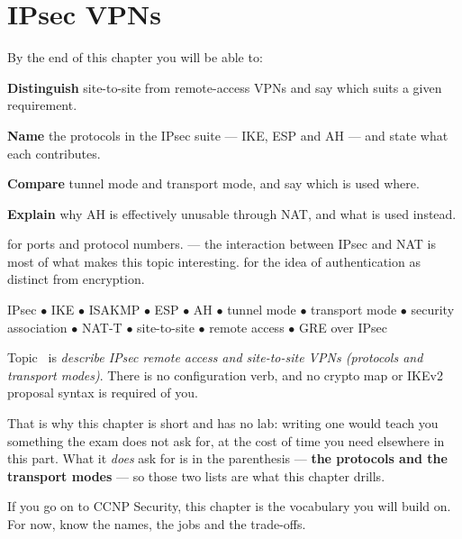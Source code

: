 \chapter{IPsec VPNs}\label{ch:vpn}

\begin{outcomes}
By the end of this chapter you will be able to:
\begin{tight}
  \item \textbf{Distinguish} site-to-site from remote-access VPNs and say which
        suits a given requirement.
  \item \textbf{Name} the protocols in the IPsec suite --- IKE, ESP and AH ---
        and state what each contributes.
  \item \textbf{Compare} tunnel mode and transport mode, and say which is used
        where.
  \item \textbf{Explain} why AH is effectively unusable through NAT, and what is
        used instead.
\end{tight}
\end{outcomes}

\begin{prereq}
 for ports and protocol numbers.  --- the interaction
between IPsec and NAT is most of what makes this topic interesting.
 for the idea of authentication as distinct from encryption.
\end{prereq}

\begin{keyterms}
IPsec $\bullet$ IKE $\bullet$ ISAKMP $\bullet$ ESP $\bullet$ AH $\bullet$ tunnel
mode $\bullet$ transport mode $\bullet$ security association $\bullet$ NAT-T
$\bullet$ site-to-site $\bullet$ remote access $\bullet$ GRE over IPsec
\end{keyterms}

\begin{examnote}
Topic~ is \emph{describe IPsec remote access and site-to-site VPNs
(protocols and transport modes)}. There is no configuration verb, and no crypto
map or IKEv2 proposal syntax is required of you.

That is why this chapter is short and has no lab: writing one would teach you
something the exam does not ask for, at the cost of time you need elsewhere in
this part. What it \emph{does} ask for is in the parenthesis --- \textbf{the
protocols and the transport modes} --- so those two lists are what this chapter
drills.

If you go on to CCNP Security, this chapter is the vocabulary you will build on.
For now, know the names, the jobs and the trade-offs.
\end{examnote}

